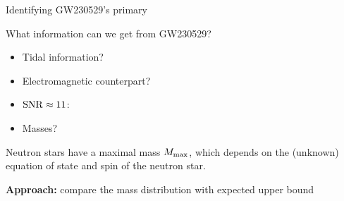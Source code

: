 \documentclass[usenames,dvipsnames,t]{beamer}
\begin{document}
\begin{frame}{Identifying GW230529's primary}

  \def\x{3mm}
  \def\y{5mm}
  \def\z{1mm}

  What information can we get from GW230529?

  \vspace{\z}

  \begin{itemize}
    \item Tidal information? 

    \vspace{\x}

    \item Electromagnetic counterpart? 

    \vspace{\x}

    \item $\rm{SNR} \approx 11$: 

    \vspace{\x}

    \item Masses? 
  \end{itemize}

  \vspace{\y}

  \pause

  Neutron stars have a maximal mass $M_{\rm{max}}$, which depends on the (unknown) equation of state and spin of the neutron star.

  \vspace{\x}

  \begin{tcolorbox}[colback=blue!10, boxrule=0pt]
    \textbf{Approach:} compare the mass distribution with expected upper bound
  \end{tcolorbox}
  
\end{frame}
\end{document}

